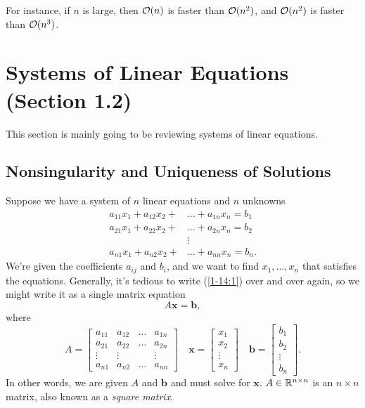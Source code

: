 \documentclass[letterpaper]{article}
\newcommand{\0}{\mathbf{0}}
\renewcommand{\b}{\mathbf{b}}
\newcommand{\x}{\mathbf{x}}
\begin{document}
For instance, if $n$ is large, then $\mathcal{O}(n)$ is faster than $\mathcal{O}(n^2)$, and $\mathcal{O}(n^2)$ is faster than $\mathcal{O}(n^3)$. 


\section{Systems of Linear Equations (Section 1.2)}
This section is mainly going to be reviewing systems of linear equations.

\subsection{Nonsingularity and Uniqueness of Solutions}
Suppose we have a system of $n$ linear equations and $n$ unknowns
\begin{equation} \label{1-14:1}
    \begin{split}
        a_{11}x_1 + a_{12}x_2 + &\hdots + a_{1n}x_n = b_1 \\
        a_{21}x_1 + a_{22}x_2 + &\hdots + a_{2n}x_n = b_2 \\
        &\vdots \\
        a_{n1}x_1 + a_{n2}x_2 + &\hdots + a_{nn}x_n = b_n.
    \end{split}
\end{equation}
We're given the coefficients $a_{ij}$ and $b_i$, and we want to find $x_1, \hdots, x_n$ that satisfies the equations. Generally, it's tedious to write (\ref{1-14:1}) over and over again, so we might write it as a single matrix equation 
\begin{equation} \label{1-14:2}
    A\x = \b,
\end{equation}
where 
\[A = \begin{bmatrix}
    a_{11} & a_{12} & \hdots & a_{1n} \\ 
    a_{21} & a_{22} & \hdots & a_{2n} \\ 
    \vdots & \vdots &        & \vdots \\ 
    a_{n1} & a_{n2} & \hdots & a_{nn}
\end{bmatrix} \quad \x = \begin{bmatrix}
    x_1 \\ x_2 \\ \vdots \\ x_n
\end{bmatrix} \quad \b = \begin{bmatrix}
    b_1 \\ b_2 \\ \vdots \\ b_n
\end{bmatrix}.\]
In other words, we are given $A$ and $\b$ and must solve for $\x$. $A \in \mathbb{R}^{n \times n}$ is an $n \times n$ matrix, also known as a \emph{square matrix}.
\end{document}
